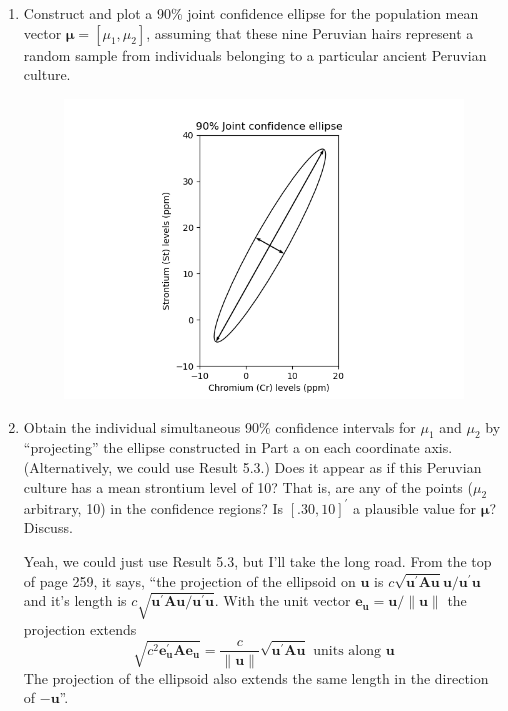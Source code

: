 \begin{enumerate}[label=(\alph*)]
    \item Construct and plot a 90\% joint confidence ellipse for the population mean vector
    $\bm{\mu} = [\mu_{1} , \mu_{2}]$, assuming that these nine Peruvian hairs represent a random sample
    from individuals belonging to a particular ancient Peruvian culture.

    \begin{figure}[H]
        \centering
            \includegraphics[scale=0.75]{./python/chapter-5/Question-5-11-a.png}
    \end{figure}

    \item Obtain the individual simultaneous 90\% confidence intervals for $\mu_{1}$ and $\mu_{2}$ by ``projecting''
    the ellipse constructed in Part a on each coordinate axis. (Alternatively, we
    could use Result 5.3.) Does it appear as if this Peruvian culture has a mean strontium
    level of 10? That is, are any of the points ($\mu_{2}$ arbitrary, 10) in the confidence regions?
    Is ${[.30, 10]}^{\prime}$ a plausible value for $\bm{\mu}$? Discuss.
    \newline
    \par
    Yeah, we could just use Result 5.3, but I'll take the long road.
    From the top of page 259, it says, ``the projection of the ellipsoid on $\textbf{u}$ is $c\sqrt{\textbf{u}^{\prime}\textbf{A}\textbf{u}}\textbf{u}/\textbf{u}^{\prime}\textbf{u}$ and it's length is $c\sqrt{\textbf{u}^{\prime}\textbf{A}\textbf{u}/\textbf{u}^{\prime}\textbf{u}}$. With the unit vector $\textbf{e}_{\textbf{u}} = \textbf{u}/\|\textbf{u}\|$ the projection extends
    \[
        \sqrt{
            c^{2}
            \textbf{e}_{\textbf{u}}^{\prime}
            \textbf{A}
            \textbf{e}_{\textbf{u}}
            }
            =
            \frac{c}{\|\textbf{u}\|}
            \sqrt{\textbf{u}^{\prime}\textbf{A}\textbf{u}}
            \text{ units along }\textbf{u}
    \]
    The projection of the ellipsoid also extends the same length in the direction of $-\textbf{u}$''.


\end{enumerate}
